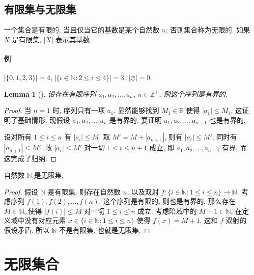\documentclass[UTF8]{ctexart}
\theoremstyle{mystyle}
\newtheorem{lemma}{Lemma}[section]
\theoremstyle{myremark}
\theoremstyle{plain}
\newcommand{\R}{\mathbb R}
\newcommand{\Z}{\mathbb Z}
\newcommand{\N}{\mathbb N}
\newcommand{\set}[1]{\{#1\}}
\begin{document}
\subsection{有限集与无限集}
\begin{definition}
    一个集合是有限的, 当且仅当它的基数是某个自然数 $ n $; 否则集合称为无限的. 如果 $ X $ 是有限集, $ |X| $ 表示其基数.
\end{definition}

\paragraph{例}
$ |\set{0, 1, 2, 3}| = 4 $, $ |\set{i \in \N \colon 2 \leqslant i \leqslant 4}| = 3 $, $ |\varnothing| = 0 $.

\begin{lemma}[]
    设存在有限序列 $ a_1, a_2, \dots, a_n $, $ n \in \Z^+ $, 则这个序列是有界的.
\end{lemma}

\begin{proof}
    当 $ n = 1 $ 时, 序列只有一项 $ a_1 $. 显然能够找到 $ M_1 \in \R $ 使得 $ |a_1| \leqslant M_1 $. 这证明了基础情形. 现假设 $ a_1, a_2, \dots, a_n $ 是有界的, 要证明 $ a_1, a_2, \dots, a_{n + 1} $ 也是有界的.

    设对所有 $ 1 \leqslant i \leqslant n $ 有 $ |a_i| \leqslant M $. 取 $ M' = M + |a_{n + 1}| $, 则有 $ |a_i| \leqslant M' $, 同时有 $ |a_{n + 1}| \leqslant M' $. 故 $ |a_i| \leqslant M' $ 对一切 $ 1 \leqslant i \leqslant n+1 $ 成立, 即 $ a_1, a_2, \dots, a_{n + 1} $ 有界, 而这完成了归纳.
\end{proof}


\begin{theorem}
    自然数 $ \N $ 是无限集.
\end{theorem}

\begin{proof}
    假设 $ \N $ 是有限集. 则存在自然数 $ n $, 以及双射 $ f \colon \set{i \in \N \colon 1 \leqslant i \leqslant n} \to \N $. 考虑序列 $ f(1), f(2), \dots, f(n) $. 这个序列是有限的, 则也是有界的. 那么存在 $ M \in \N $, 使得 $ |f(i)| \leqslant M $ 对一切 $ 1 \leqslant i \leqslant n $ 成立. 考虑陪域中的 $ M + 1 \in \N $, 在定义域中没有对应元素 $ x \in \set{i \in \N \colon 1 \leqslant i \leqslant n} $ 使得 $ f(x) = M + 1 $, 这和 $ f $ 双射的假设矛盾. 所以 $ \N $ 不是有限集, 也就是无限集.
\end{proof}


\section{无限集合}
\end{document}
